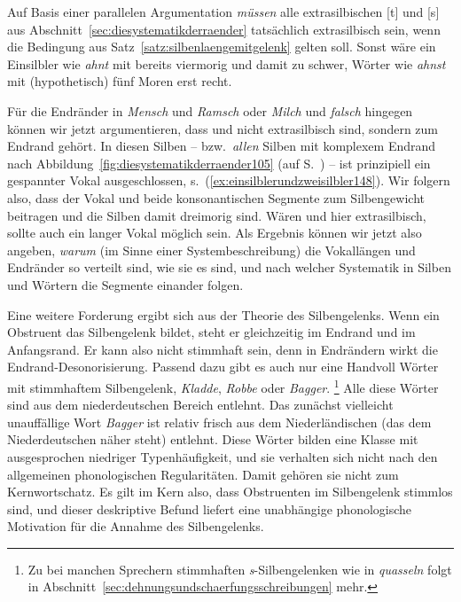 Auf Basis einer parallelen Argumentation \textit{müssen} alle extrasilbischen [t] und [s] aus Abschnitt~\ref{sec:diesystematikderraender} tatsächlich extrasilbisch sein, wenn die Bedingung aus Satz~\ref{satz:silbenlaengemitgelenk} gelten soll.
Sonst wäre ein Einsilbler wie \textit{ahnt} mit \textipa{[Pa:nt]} bereits viermorig und damit zu schwer, Wörter wie \textit{ahnst} mit (hypothetisch) fünf Moren erst recht.

Für die Endränder in \textit{Mensch} und \textit{Ramsch} oder \textit{Milch} und \textit{falsch} hingegen können wir jetzt argumentieren, dass \textipa{[S]} und \textipa{[\c{c}]} nicht extrasilbisch sind, sondern zum Endrand gehört.
In diesen Silben -- bzw.\ \textit{allen} Silben mit komplexem Endrand nach Abbildung~\ref{fig:diesystematikderraender105} (auf S.~\pageref{fig:diesystematikderraender105}) -- ist prinzipiell ein gespannter Vokal ausgeschlossen, s.\ (\ref{ex:einsilblerundzweisilbler148}).
Wir folgern also, dass der Vokal und beide konsonantischen Segmente zum Silbengewicht beitragen und die Silben damit dreimorig sind.
Wären \textipa{[S]} und \textipa{[\c{c}]} hier extrasilbisch, sollte auch ein langer Vokal möglich sein.
Als Ergebnis können wir jetzt also angeben, \textit{warum} (im Sinne einer Systembeschreibung) die Vokallängen und Endränder so verteilt sind, wie sie es sind, und nach welcher Systematik in Silben und Wörtern die Segmente einander folgen.

\begin{exe}
  \ex \label{ex:einsilblerundzweisilbler148}
  \begin{xlist}
    \ex[*]{\textipa{[mE:nS]}}
    \ex[*]{\textipa{[ra:mS]}}
    \ex[*]{\textipa{[mi:l\c{c}]}}
    \ex[*]{\textipa{[fa:lS]}}
  \end{xlist}
\end{exe}

\label{abs:einsilblerundzweisilbler149}
Eine weitere Forderung ergibt sich aus der Theorie des Silbengelenks.
Wenn ein Obstruent das Silbengelenk bildet, steht er gleichzeitig im Endrand und im Anfangsrand.
Er kann also nicht stimmhaft sein, denn in Endrändern wirkt die Endrand-Desonorisierung.
\label{abs:einsilblerundzweisilbler150}Passend dazu gibt es auch nur eine Handvoll Wörter mit stimmhaftem Silbengelenk, \zB \textit{Kladde}, \textit{Robbe} oder \textit{Bagger}.%
\footnote{Zu bei manchen Sprechern stimmhaften \textit{s}-Silbengelenken wie in \textit{quasseln} folgt in Abschnitt~\ref{sec:dehnungsundschaerfungsschreibungen} mehr.}
Alle diese Wörter sind aus dem niederdeutschen Bereich entlehnt.
Das zunächst vielleicht unauffällige Wort \textit{Bagger} ist relativ frisch aus dem Niederländischen (das dem Niederdeutschen näher steht) entlehnt.
Diese Wörter bilden eine Klasse mit ausgesprochen niedriger Typenhäufigkeit, und sie verhalten sich nicht nach den allgemeinen phonologischen Regularitäten.
Damit gehören sie nicht zum Kernwortschatz.
Es gilt im Kern also, dass Obstruenten im Silbengelenk stimmlos sind, und dieser deskriptive Befund liefert eine unabhängige phonologische Motivation für die Annahme des Silbengelenks.

